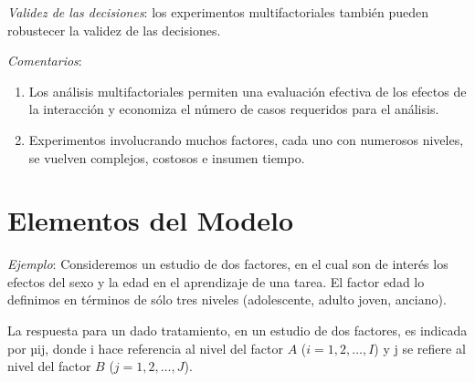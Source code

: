 \documentclass[]{book}
\theoremstyle{definition}
\theoremstyle{definition}
\theoremstyle{definition}
\theoremstyle{remark}
\begin{document}
\emph{Validez de las decisiones}: los experimentos multifactoriales
también pueden robustecer la validez de las decisiones.

\emph{Comentarios}:

\begin{enumerate}
\def\labelenumi{\arabic{enumi}.}
\item
  Los análisis multifactoriales permiten una evaluación efectiva de los
  efectos de la interacción y economiza el número de casos requeridos
  para el análisis.
\item
  Experimentos involucrando muchos factores, cada uno con numerosos
  niveles, se vuelven complejos, costosos e insumen tiempo.
\end{enumerate}

\hypertarget{elementos-del-modelo}{%
\section{Elementos del Modelo}\label{elementos-del-modelo}}

\emph{Ejemplo}: Consideremos un estudio de dos factores, en el cual son
de interés los efectos del sexo y la edad en el aprendizaje de una
tarea. El factor edad lo definimos en términos de sólo tres niveles
(adolescente, adulto joven, anciano).

La respuesta para un dado tratamiento, en un estudio de dos factores, es
indicada por µij, donde i hace referencia al nivel del factor \(A\)
(\(i = 1,2,\ldots,I\)) y j se refiere al nivel del factor \(B\)
(\(j = 1,2,\ldots,J\)).
\end{document}
